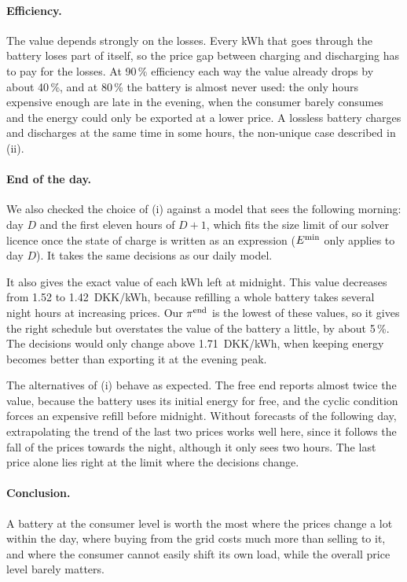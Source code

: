 \paragraph{Efficiency.} The value depends strongly on the losses. Every kWh that goes through the
battery loses part of itself, so the price gap between charging and discharging has to pay for
the losses. At 90\,\% efficiency each way the value already drops by about 40\,\%, and at
80\,\% the battery is almost never used: the only hours expensive enough are late in the
evening, when the consumer barely consumes and the energy could only be exported at a lower
price. A lossless battery charges and discharges at the same time in some hours, the non-unique
case described in (ii).

\paragraph{End of the day.} We also checked the choice of (i) against a model that sees the
following morning: day $D$ and the first eleven hours of $D+1$, which fits the size limit of our
solver licence once the state of charge is written as an expression ($E^{\min}$ only applies to
day $D$). It takes the same decisions as our daily model.

It also gives the exact value of each kWh left at midnight. This value decreases from 1.52 to
1.42~DKK/kWh, because refilling a whole battery takes several night hours at increasing prices.
Our $\pi^{\mathrm{end}}$ is the lowest of these values, so it gives the right schedule but overstates the
value of the battery a little, by about 5\,\%. The decisions would only change above
1.71~DKK/kWh, when keeping energy becomes better than exporting it at the evening peak.

The alternatives of (i) behave as expected. The free end reports almost twice the value, because
the battery uses its initial energy for free, and the cyclic condition forces an expensive refill
before midnight. Without forecasts of the following day, extrapolating the trend of the last two
prices works well here, since it follows the fall of the prices towards the night, although it
only sees two hours. The last price alone lies right at the limit where the decisions change.

\paragraph{Conclusion.} A battery at the consumer level is worth the most where the prices change
a lot within the day, where buying from the grid costs much more than selling to it, and where
the consumer cannot easily shift its own load, while the overall price level barely matters.


